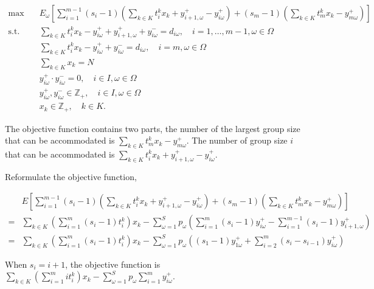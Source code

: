 \begin{equation}\label{deterministic_form}
\begin{aligned}
\max \quad & E_{\omega}\left[\sum_{i=1}^{m-1} (s_i-1) (\sum_{k \in K} t_i^k x_{k} + y_{i+1,\omega}^{+} - y_{i \omega}^{+}) + (s_m-1) (\sum_{k \in K} t_m^k x_{k} - y_{m \omega}^{+})\right] \\
\text {s.t.} \quad & \sum_{k \in K} t_{i}^{k} x_{k}-y_{i \omega}^{+}+
y_{i+1, \omega}^{+} + y_{i \omega}^{-}=d_{i \omega}, \quad i =1,\ldots,m-1, \omega \in \Omega \\
& \sum_{k \in K} t_{i}^{k} x_{k}-y_{i \omega}^{+}+y_{i \omega}^{-}=d_{i \omega}, \quad i = m, \omega \in \Omega \\
& \sum_{k \in K} x_{k} = N \\
& y_{i \omega}^{+} \cdot y_{i \omega}^{-}=0, \quad i \in I, \omega \in \Omega \\
& y_{i \omega}^{+}, y_{i \omega}^{-} \in \mathbb{Z}_{+}, \quad i \in I, \omega \in \Omega \\
& x_{k} \in \mathbb{Z}_{+}, \quad k \in K.
\end{aligned}
\end{equation}

The objective function contains two parts, the number of the largest group size that can be accommodated is $\sum_{k \in K} t_m^k x_{k} - y_{m \omega}^{+}$. The number of group size $i$ that can be accommodated is $\sum_{k \in K} t_i^k x_{k} + y_{i+1,\omega}^{+} - y_{i \omega}^{+}$.

Reformulate the objective function,

\begin{align*}
  & E[\sum_{i=1}^{m-1} (s_i-1) (\sum_{k \in K} t_i^k x_{k} + y_{i+1,\omega}^{+} - y_{i \omega}^{+}) + (s_m-1) (\sum_{k \in K} t_m^k x_{k} - y_{m \omega}^{+})] \\
  =& \sum_{k \in K}(\sum_{i=1}^m (s_i-1)t_i^k) x_{k}- \sum_{\omega =1}^{S} p_{\omega} \left(\sum_{i=1}^{m}(s_i-1)y_{i \omega}^{+} - \sum_{i=1}^{m-1}(s_i-1)y_{i+1, \omega}^{+}\right) \\
  =& \sum_{k \in K}(\sum_{i=1}^m (s_i-1)t_i^k) x_{k} - 
  \sum_{\omega =1}^{S} p_{\omega} \left((s_1-1)y_{1 \omega}^{+} + \sum_{i=2}^{m}(s_{i}-s_{i-1}) y_{i \omega}^{+} \right)
\end{align*}

When $s_i = i+1$, the objective function is $\sum_{k \in K}(\sum_{i=1}^m i t_i^k) x_{k} - \sum_{\omega =1}^{S} p_{\omega} \sum_{i=1}^{m} y_{i \omega}^{+}$.


